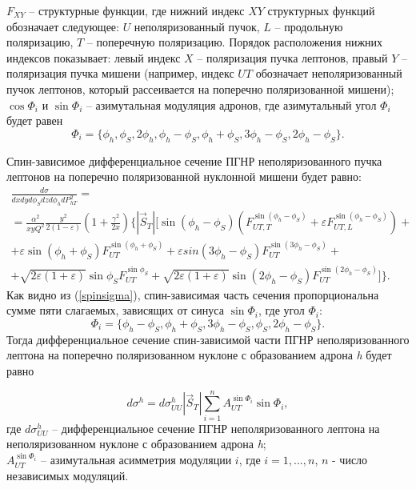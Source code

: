 \documentclass{extarticle}
\begin{document}
$F_{XY}$ -- структурные функции, где нижний индекс $XY$ структурных функций обозначает следующее: $U$ неполяризованный пучок, $L$ -- продольную поляризацию, $T$ -- поперечную поляризацию. Порядок расположения нижних индексов показывает: левый индекс $X$ -- поляризация пучка лептонов, правый $Y$ -- поляризация пучка мишени (например, индекс $UT$ обозначает неполяризованный пучок лептонов, который рассеивается на поперечно поляризованной мишени);
\\
$\cos \Phi_i$ и $ \sin \Phi_i$ -- азимутальная модуляция адронов, где азимутальный угол $\Phi_i$ будет равен 
\begin{equation}
	\Phi_i =  \lbrace \phi_h, \phi_S, 2\phi_h, \phi_h - \phi_S, \phi_h + \phi_S, 3\phi_h - \phi_S, 2\phi_h - \phi_S \rbrace.
\end{equation}

Спин-зависимое дифференциальное сечение ПГНР неполяризованного пучка лептонов на поперечно поляризованной нуклонной мишени будет равно:
\begin{multline}
	\label{spinsigma}
	\frac{d\sigma}{dx dy d \phi_S dz d \phi_{h} dP^{2}_{h T}} = \\
	= \frac{\alpha^2}{xy Q^{2}} \frac{y^2}{2 (1 - \varepsilon)} \left(1 + \frac{\gamma^2}{2x} \right) \Biggl \lbrace 	
	 |\vec S_{T}| \Biggl[ \sin(\phi_h - \phi_S) \left(F_{U T, T}^{\sin(\phi_h - \phi_S)} +
	\varepsilon F_{UT, L}^{\sin(\phi_h - \phi_S)} \right) + \\
	+ \varepsilon \sin(\phi_h + \phi_S) F_{U T}^{\sin (\phi_h + \phi_S)} +
	\varepsilon sin (3\phi_h - \phi_S) F_{UT}^{\sin (3\phi_h - \phi_S)} + \\
	+ \sqrt{2 \varepsilon (1 + \varepsilon)} \sin \phi_S F_{UT}^{\sin \phi_S} +
	\sqrt{2 \varepsilon (1 + \varepsilon)} \sin(2\phi_h - \phi_S) F_{UT}^{\sin(2\phi_h - \phi_S)}  \Biggr ]\Biggr \rbrace.
\end{multline}
Как видно из (\ref{spinsigma}), спин-зависимая часть сечения пропорциональна сумме пяти слагаемых, зависящих от синуса $\sin \Phi_i$, где угол $\Phi_i$:  
\begin{equation}
	\Phi_i = \lbrace \phi_h - \phi_S, \phi_h + \phi_S, 3\phi_h - \phi_S, \phi_S,2 \phi_h - \phi_S \rbrace. 
\end{equation}
Тогда дифференциальное сечение спин-зависимой части ПГНР неполяризованного лептона на поперечно поляризованном нуклоне с образованием адрона \textit{h} будет равно

\begin{equation}
	d\sigma^h = d\sigma^h_{UU} |\vec S_{T}| \sum_{i = 1}^n A_{UT}^{\sin \Phi_i} \sin \Phi_i,
\end{equation}
где $d\sigma^h_{UU}$ -- дифференциальное сечение ПГНР неполяризованного лептона на неполяризованном нуклоне с образованием адрона \textit{h}; \\ $A_{UT}^{\sin \Phi_i}$ -- азимутальная асимметрия модуляции $i$, где $i = 1, ... , n$, $n$ - число независимых модуляций.
\end{document}
